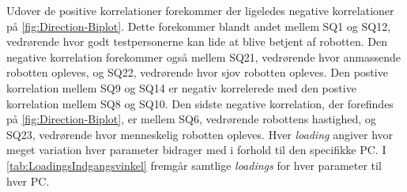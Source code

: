 Udover de positive korrelationer forekommer der ligeledes negative korrelationer på \autoref{fig:Direction-Biplot}. Dette forekommer blandt andet mellem SQ1 og SQ12, vedrørende hvor godt testpersonerne kan lide at blive betjent af robotten. Den negative korrelation forekommer også mellem SQ21, vedrørende hvor anmassende robotten opleves, og SQ22, vedrørende hvor sjov robotten opleves. Den postive korrelation mellem SQ9 og SQ14 er negativ korrelerede med den postive korrelation mellem SQ8 og SQ10. Den sidste negative korrelation, der forefindes på \autoref{fig:Direction-Biplot}, er mellem SQ6, vedrørende robottens hastighed, og SQ23, vedrørende hvor menneskelig robotten opleves. \blankline
%
Hver \textit{loading} angiver hvor meget variation hver parameter bidrager med i forhold til den specifikke PC. I \autoref{tab:LoadingsIndgangsvinkel} fremgår samtlige \textit{loadings} for hver parameter til hver PC.  
%
